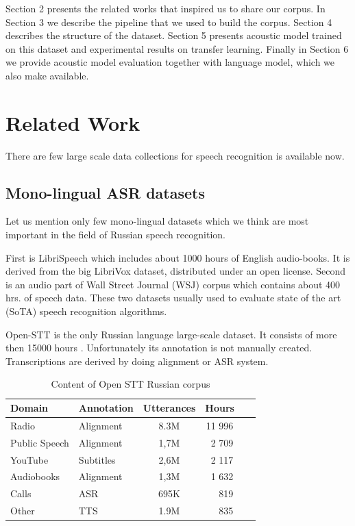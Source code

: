 \documentclass[a4paper]{article}
\begin{document}
Section 2 presents the related works that inspired us to share our corpus. In Section 3 we describe the pipeline that we used to build the corpus. Section 4 describes the structure of the dataset. Section 5 presents acoustic model trained on this dataset and experimental results on transfer learning. Finally in Section 6 we provide acoustic model  evaluation together with language model, which we also make available.

\section{Related Work}

There are few large scale data collections for speech recognition is available now. 

\subsection{Mono-lingual ASR datasets}

Let us mention only few mono-lingual datasets which we think are most important in the field of Russian speech recognition.

First is LibriSpeech  \cite{panayotov2015librispeech} which  includes about 1000 hours of English audio-books. It is derived from the big LibriVox dataset,  distributed under an open license. Second is an audio part of Wall Street Journal (WSJ) corpus \cite{paul1992design} which contains about 400 hrs. of speech data. These two datasets usually used to evaluate state of the art (SoTA) speech recognition algorithms.

Open-STT is the only Russian language large-scale dataset. It consists of more then 15000 hours \cite{veysov2020towardimagenetstt}. Unfortunately its annotation is not manually created. Transcriptions are derived by doing  alignment or ASR system. 

\begin{table}[th]
  \caption{Content of Open STT Russian corpus}
  \label{tab:openstt}
  \centering
  \begin{tabular}{ llcr }
    \toprule
    Domain & Annotation & Utterances & Hours~~~  \\
    \midrule
    Radio &     Alignment & 8.3M & 11 996 ~~~  \\
    Public Speech & Alignment  & 1,7M & 2 709 ~~~ \\
    YouTube & Subtitles  & 2,6M & 2 117 ~~~ \\
    Audiobooks & Alignment  & 1,3M & 1 632 ~~~ \\
    Calls & ASR  & 695K & 819 ~~~ \\
    Other & TTS  & 1.9M & 835 ~~~ \\
    \bottomrule
  \end{tabular}
\end{table}
\end{document}
